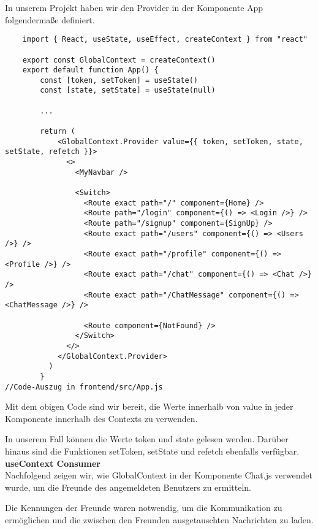 In unserem Projekt haben wir den Provider in der Komponente App folgendermaße definiert.

 \begin{lstlisting}
    import { React, useState, useEffect, createContext } from "react"

    export const GlobalContext = createContext()
    export default function App() {
        const [token, setToken] = useState()
        const [state, setState] = useState(null)
        
        ...
   
        return (
            <GlobalContext.Provider value={{ token, setToken, state, setState, refetch }}>
              <>
                <MyNavbar />
        
                <Switch>
                  <Route exact path="/" component={Home} />
                  <Route path="/login" component={() => <Login />} />
                  <Route path="/signup" component={SignUp} />
                  <Route exact path="/users" component={() => <Users />} />
                  <Route exact path="/profile" component={() => <Profile />} />
                  <Route exact path="/chat" component={() => <Chat />} />
                  <Route exact path="/ChatMessage" component={() => <ChatMessage />} />
        
                  <Route component={NotFound} />
                </Switch>
              </>
            </GlobalContext.Provider>
          )
        }
//Code-Auszug in frontend/src/App.js
 \end{lstlisting}
 Mit dem obigen Code sind wir bereit, die Werte innerhalb von value in jeder Komponente innerhalb des Contexts zu verwenden.

 In unserem Fall können die Werte token und state gelesen werden. Darüber hinaus sind die Funktionen setToken, setState und refetch ebenfalls verfügbar.
\\
\textbf{useContext Consumer} \\
Nachfolgend zeigen wir, wie GlobalContext in der Komponente Chat.js verwendet wurde, um die Freunde des angemeldeten Benutzers zu ermitteln.

Die Kennungen der Freunde waren notwendig, um die Kommunikation zu ermöglichen und die zwischen den Freunden ausgetauschten Nachrichten zu laden.

